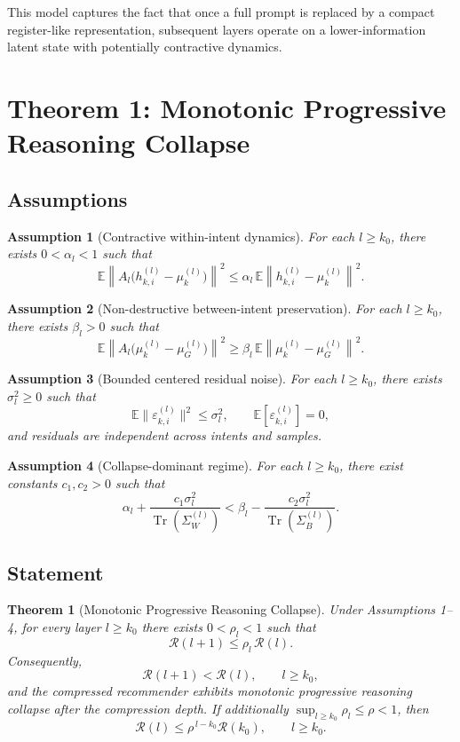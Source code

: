 \documentclass[11pt]{article}
\newtheorem{theorem}{Theorem}
\newtheorem{assumption}{Assumption}
\newcommand{\E}{\mathbb{E}}
\newcommand{\tr}{\operatorname{Tr}}
\begin{document}
This model captures the fact that once a full prompt is replaced by a compact register-like representation, subsequent layers operate on a lower-information latent state with potentially contractive dynamics.

\section{Theorem 1: Monotonic Progressive Reasoning Collapse}

\subsection{Assumptions}

\begin{assumption}[Contractive within-intent dynamics]
For each $l \ge k_0$, there exists $0 < \alpha_l < 1$ such that
\[
\E \left\|A_l\bigl(h_{k,i}^{(l)} - \mu_k^{(l)}\bigr)\right\|^2
\le
\alpha_l \,
\E \left\|h_{k,i}^{(l)} - \mu_k^{(l)}\right\|^2.
\]
\end{assumption}

\begin{assumption}[Non-destructive between-intent preservation]
For each $l \ge k_0$, there exists $\beta_l > 0$ such that
\[
\E \left\|A_l\bigl(\mu_k^{(l)} - \mu_G^{(l)}\bigr)\right\|^2
\ge
\beta_l \,
\E \left\|\mu_k^{(l)} - \mu_G^{(l)}\right\|^2.
\]
\end{assumption}

\begin{assumption}[Bounded centered residual noise]
For each $l \ge k_0$, there exists $\sigma_l^2 \ge 0$ such that
\[
\E \|\varepsilon_{k,i}^{(l)}\|^2 \le \sigma_l^2,
\qquad
\E[\varepsilon_{k,i}^{(l)}]=0,
\]
and residuals are independent across intents and samples.
\end{assumption}

\begin{assumption}[Collapse-dominant regime]
For each $l \ge k_0$, there exist constants $c_1,c_2>0$ such that
\[
\alpha_l + \frac{c_1 \sigma_l^2}{\tr(\Sigma_W^{(l)})}
<
\beta_l - \frac{c_2 \sigma_l^2}{\tr(\Sigma_B^{(l)})}.
\]
\end{assumption}

\subsection{Statement}

\begin{theorem}[Monotonic Progressive Reasoning Collapse]
Under Assumptions 1--4, for every layer $l \ge k_0$ there exists $0<\rho_l<1$ such that
\[
\mathcal{R}(l+1) \le \rho_l \,\mathcal{R}(l).
\]
Consequently,
\[
\mathcal{R}(l+1) < \mathcal{R}(l),
\qquad l \ge k_0,
\]
and the compressed recommender exhibits monotonic progressive reasoning collapse after the compression depth.
If additionally $\sup_{l\ge k_0}\rho_l \le \rho <1$, then
\[
\mathcal{R}(l) \le \rho^{\,l-k_0}\mathcal{R}(k_0),
\qquad l \ge k_0.
\]
\end{theorem}
\end{document}
